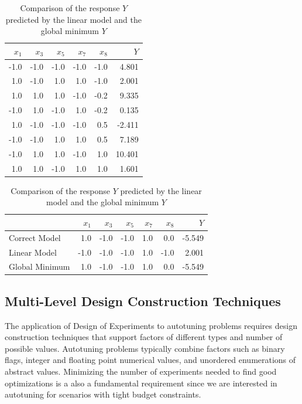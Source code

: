 \documentclass[conference]{IEEEtran}
\begin{document}
\begin{table}[ht]
\centering
\caption{Comparison of the response $Y$ predicted by the linear model and the global minimum $Y$}
\begingroup\footnotesize
\begin{tabular}{rrrrrr}
  \toprule
$x_1$ & $x_3$ & $x_5$ & $x_7$ & $x_8$ & $Y$ \\
  \midrule
-1.0 & -1.0 & -1.0 & -1.0 & -1.0 & 4.801 \\
  1.0 & -1.0 & 1.0 & 1.0 & -1.0 & 2.001 \\
  1.0 & 1.0 & 1.0 & -1.0 & -0.2 & 9.335 \\
  -1.0 & 1.0 & -1.0 & 1.0 & -0.2 & 0.135 \\
  1.0 & -1.0 & -1.0 & -1.0 & 0.5 & -2.411 \\
  -1.0 & -1.0 & 1.0 & 1.0 & 0.5 & 7.189 \\
  -1.0 & 1.0 & 1.0 & -1.0 & 1.0 & 10.401 \\
  1.0 & 1.0 & -1.0 & 1.0 & 1.0 & 1.601 \\
   \bottomrule
\end{tabular}
\endgroup
\end{table}

\begin{table}[ht]
\centering
\caption{Comparison of the response $Y$ predicted by the linear model and the global minimum $Y$}
\begingroup\footnotesize
\begin{tabular}{lrrrrrr}
  \toprule
 & $x_1$ & $x_3$ & $x_5$ & $x_7$ & $x_8$ & $Y$ \\
  \midrule
Correct Model & 1.0 & -1.0 & -1.0 & 1.0 & 0.0 & -5.549 \\
  Linear Model & -1.0 & -1.0 & -1.0 & 1.0 & -1.0 & 2.001 \\
  Global Minimum & 1.0 & -1.0 & -1.0 & 1.0 & 0.0 & -5.549 \\
   \bottomrule
\end{tabular}
\endgroup
\end{table}
\subsection{Multi-Level Design Construction Techniques}
\label{sec:org38e753d}
The application of Design of Experiments to autotuning problems requires design
construction techniques that support factors of different types and number of
possible values. Autotuning problems typically combine factors such as binary
flags, integer and floating point numerical values, and unordered enumerations
of abstract values. Minimizing the number of experiments needed to find good
optimizations is a also a fundamental requirement since we are interested in
autotuning for scenarios with tight budget constraints.
\end{document}
